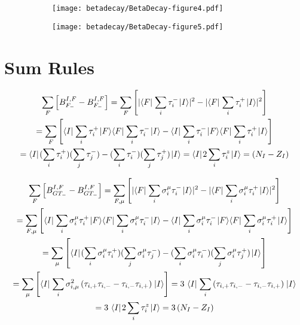 \documentclass[thesis.tex]{subfiles}
\begin{document}
\begin{figure}
  \centering
  \begin{subfigure}{0.5\linewidth}
    \centering
    \hspace{1.0cm}
    \texttt{[image: betadecay/BetaDecay-figure4.pdf]}
  \end{subfigure}
  \hspace{-0.175\linewidth}
  \begin{subfigure}{0.5\linewidth}
    \centering
    \hspace{1.0cm}
    \texttt{[image: betadecay/BetaDecay-figure5.pdf]}
  \end{subfigure}
\end{figure}



\section{Sum Rules}

\begin{gather}
  \sum_{F} \left[ B_{F_{-}}^{I,F} - B_{F_{-}}^{I,F} \right] = \sum_{F} \left[ \lvert \langle F |\hspace{1pt}\sum_{i}\tau_{i}^{-}\hspace{1pt}\lvert I \rangle \rvert^{2} - \lvert \langle F |\hspace{1pt}\sum_{i}\tau_{i}^{+}\hspace{1pt}\lvert I \rangle \rvert^{2} \right] \notag \\
  = \sum_{F} \left[ \langle I |\hspace{1pt}\sum_{i}\tau_{i}^{+}\hspace{1pt}\lvert F \rangle\langle F |\hspace{1pt}\sum_{i}\tau_{i}^{-}\hspace{1pt}\lvert I \rangle - \langle I |\hspace{1pt}\sum_{i}\tau_{i}^{-}\hspace{1pt}\lvert F \rangle\langle F |\hspace{1pt}\sum_{i}\tau_{i}^{+}\hspace{1pt}\lvert I \rangle \right] \notag \\
  = \langle I |\hspace{1pt} (\sum_{i}\tau_{i}^{+}) (\sum_{j}\tau_{j}^{-}) - (\sum_{i}\tau_{i}^{-}) (\sum_{j}\tau_{j}^{+}) \hspace{1pt}\lvert I \rangle = \langle I |\hspace{1pt} 2\sum_{i}\tau_{i}^{z} \hspace{1pt}\lvert I \rangle = \left( N_{I} - Z_{I} \right)
\end{gather}

\begin{gather}
  \sum_{F} \left[ B_{GT_{-}}^{I,F} - B_{GT_{-}}^{I,F} \right] = \sum_{F,\mu} \left[ \lvert \bra{F}\sum_{i}\sigma_{i}^{\mu}\tau_{i}^{-}\ket{I} \rvert^{2} - \lvert \bra{F}\sum_{i}\sigma_{i}^{\mu}\tau_{i}^{+}\ket{I} \rvert^{2} \right] \notag \\
  = \sum_{F,\mu} \left[ \bra{I}\sum_{i}\sigma_{i}^{\mu}\tau_{i}^{+}\ket{F}\bra{F}\sum_{i}\sigma_{i}^{\mu}\tau_{i}^{-}\ket{I} - \bra{I}\sum_{i}\sigma_{i}^{\mu}\tau_{i}^{-}\ket{F}\bra{F}\sum_{i}\sigma_{i}^{\mu}\tau_{i}^{+}\ket{I} \right] \notag \\
  = \sum_{\mu} \left[ \bra{I} (\sum_{i}\sigma_{i}^{\mu}\tau_{i}^{+}) (\sum_{j}\sigma_{i}^{\mu}\tau_{j}^{-}) - (\sum_{i}\sigma_{i}^{\mu}\tau_{i}^{-}) (\sum_{j}\sigma_{i}^{\mu}\tau_{j}^{+}) \ket{I} \right] \notag \\
  = \sum_{\mu} \left[ \bra{I} \sum_{i}\sigma_{i,\mu}^{2}\left( \tau_{i,+}\tau_{i,-} - \tau_{i,-}\tau_{i,+} \right) \ket{I} \right] = 3\ \bra{I} \sum_{i}\left( \tau_{i,+}\tau_{i,-} - \tau_{i,-}\tau_{i,+} \right) \ket{I} \notag \\
  = 3\ \bra{I} 2\sum_{i}\tau_{i}^{z} \ket{I} = 3\left( N_{I} - Z_{I} \right)
\end{gather}
\end{document}
